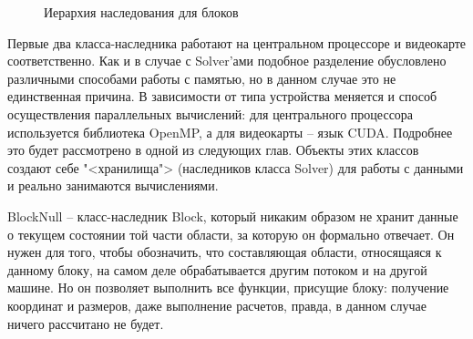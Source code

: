 \documentclass[a4paper, 14pt]{extarticle}
\theoremstyle{definition}
\begin{document}
\begin{figure}[h]
	\caption{Иерархия наследования для блоков}
	\label{ris:blocks}
\end{figure}

\par Первые два класса-наследника работают на центральном процессоре и видеокарте соответственно. Как и в случае с Solver'ами подобное разделение обусловлено различными способами работы с памятью, но в данном случае это не единственная причина. В зависимости от типа устройства меняется и способ осуществления параллельных вычислений: для центрального процессора используется библиотека OpenMP, а для видеокарты -- язык CUDA. Подробнее это будет рассмотрено в одной из следующих глав. Объекты этих классов создают себе "<хранилища"> (наследников класса Solver) для работы с данными и реально занимаются вычислениями.

\par BlockNull -- класс-наследник Block, который никаким образом не хранит данные о текущем состоянии той части области, за которую он формально отвечает. Он нужен для того, чтобы обозначить, что составляющая области, относящаяся к данному блоку, на самом деле обрабатывается другим потоком и на другой машине. Но он позволяет выполнить все функции, присущие блоку: получение координат и размеров, даже выполнение расчетов, правда, в данном случае ничего рассчитано не будет.
\end{document}
